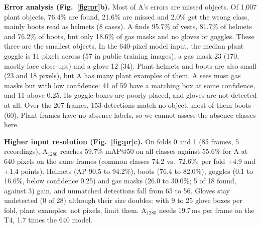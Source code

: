 \textbf{Error analysis (Fig.~\ref{fig:pr}b).} Most of A's errors are missed objects. Of 1{,}007 plant objects, 76.4\% are found, 21.6\% are missed and 2.0\% get the wrong class, mainly boots read as helmets (8 cases). A finds 95.7\% of vests, 81.7\% of helmets and 76.2\% of boots, but only 18.6\% of gas masks and no gloves or goggles. These three are the smallest objects. In the 640-pixel model input, the median plant goggle is 11 pixels across (57 in public training images), a gas mask 23 (170, mostly face close-ups) and a glove 12 (34). Plant helmets and boots are also small (23 and 18 pixels), but A has many plant examples of them. A sees most gas masks but with low confidence: 41 of 59 have a matching box at some confidence, and 11 above 0.25. Its goggle boxes are poorly placed, and gloves are not detected at all. Over the 207 frames, 153 detections match no object, most of them boots (60). Plant frames have no absence labels, so we cannot assess the absence classes here.

\textbf{Higher input resolution (Fig.~\ref{fig:pr}c).} On folds 0 and 1 (85 frames, 5 recordings), A$_{1280}$ reaches 59.7\% mAP@50 on all classes against 55.6\% for A at 640 pixels on the same frames (common classes 74.2 vs.\ 72.6\%; per fold +4.9 and +1.4 points). Helmets (AP 90.5 to 94.2\%), boots (76.4 to 82.0\%), goggles (0.1 to 16.6\%, below confidence 0.25) and gas masks (26.0 to 30.0\%; 5 of 18 found, against 3) gain, and unmatched detections fall from 65 to 56. Gloves stay undetected (0 of 28) although their size doubles: with 9 to 25 glove boxes per fold, plant examples, not pixels, limit them. A$_{1280}$ needs 19.7\,ms per frame on the T4, 1.7 times the 640 model.
